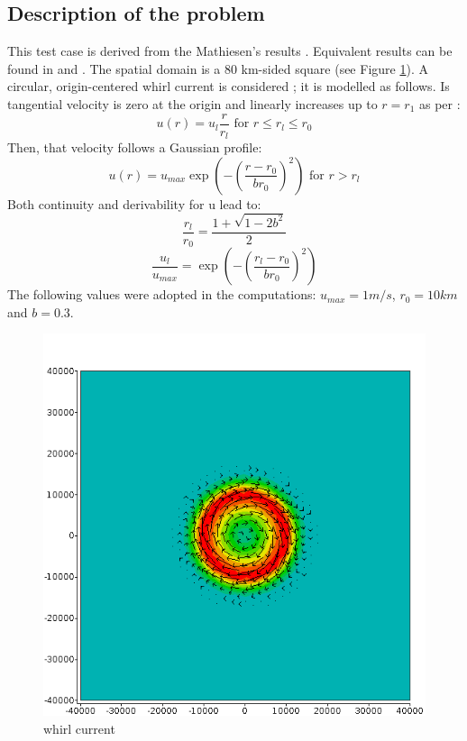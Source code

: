 \subsection{Description of the problem}
%
This test case is derived from the Mathiesen's results \cite{Mathiesen1987}.
Equivalent results can be found in \cite{Tolman1991} and \cite{Hubbert1991}. The
spatial domain is a 80 km-sided square (see Figure \ref{current}). A circular,
origin-centered whirl current is considered ; it is modelled as follows. Is
tangential velocity is zero at the origin and linearly increases up to $r=r_1$
as per :
$$
u(r) = u_l\frac{r}{r_l} \mbox{ for } r\le r_l\le r_0
$$
Then, that velocity follows a Gaussian profile:
$$
u(r)=u_{max} \exp \left( -\left(\frac{r-r_0}{br_0}\right)^2 \right) \mbox{ for } r > r_l
$$
Both continuity and derivability for u lead to:
$$
\frac{r_l}{r_0}=\frac{1+ \sqrt{1-2b^2}}{2} %
$$
$$
\frac{u_l}{u_{max}}= \exp \left( -\left(\frac{r_l-r_0}{br_0}\right)^2 \right)
$$
The following values were adopted in the computations: $u_{max}=1m/s$,
$r_0=10km$ and $b=0.3$.
%
%
\begin{figure} [!h]
\centering
\includegraphics[scale = 0.7]{current.png}
 \caption{whirl current}
\label{current}
\end{figure}
